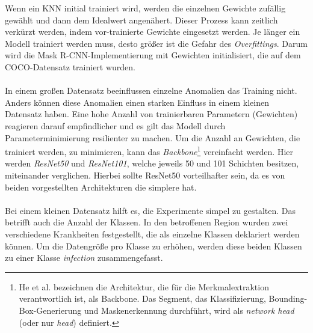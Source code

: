 Wenn ein KNN initial trainiert wird, werden die einzelnen Gewichte zufällig gewählt und dann dem Idealwert angenähert. Dieser Prozess kann zeitlich verkürzt werden, indem vor-trainierte Gewichte eingesetzt werden. Je länger ein Modell trainiert werden muss, desto größer ist die Gefahr des \textit{Overfittings}. Darum wird die Mask R-CNN-Implementierung mit Gewichten initialisiert, die auf dem COCO-Datensatz trainiert wurden.
\\\\
In einem großen Datensatz beeinflussen einzelne Anomalien das Training nicht. Anders können diese Anomalien einen starken Einfluss in einem kleinen Datensatz haben. Eine hohe Anzahl von trainierbaren Parametern (Gewichten) reagieren darauf empfindlicher und es gilt das Modell durch Parameterminimierung resilienter zu machen. Um die Anzahl an Gewichten, die trainiert werden, zu minimieren, kann das \textit{Backbone}\footnote{He et al. bezeichnen die Architektur, die für die Merkmalextraktion verantwortlich ist, als Backbone. Das Segment, das Klassifizierung, Bounding-Box-Generierung und Maskenerkennung durchführt, wird als \textit{network head} (oder nur \textit{head}) definiert.\cite[S. 4]{ref:maskrcnn}} vereinfacht werden. Hier werden \textit{ResNet50} und \textit{ResNet101}, welche jeweils 50 und 101 Schichten besitzen, miteinander verglichen. Hierbei sollte ResNet50 vorteilhafter sein, da es von beiden vorgestellten Architekturen die simplere hat.
\\\\
Bei einem kleinen Datensatz hilft es, die Experimente simpel zu gestalten. Das betrifft auch die Anzahl der Klassen. In den betroffenen Region wurden zwei verschiedene Krankheiten festgestellt, die als einzelne Klassen deklariert werden können. Um die Datengröße pro Klasse zu erhöhen, werden diese beiden Klassen zu einer Klasse \textit{infection} zusammengefasst. 